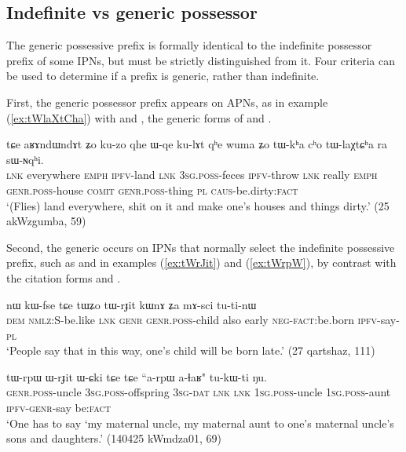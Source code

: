 \subsection{Indefinite vs generic possessor} \label{sec:indef.genr.poss}
The generic possessive prefix  is formally identical to the indefinite possessor prefix of some IPNs, but must be strictly distinguished from it. Four criteria can be used to determine if a  prefix is generic, rather than indefinite.

First, the generic possessor prefix appears on APNs, as in example (\ref{ex:tWlaXtCha}) with  and , the generic forms of  and .

\begin{exe}
\ex \label{ex:tWlaXtCha}
\gll tɕe  	aʁɤndɯndɤt  	ʑo  	ku-zo  	qhe  	ɯ-qe  	ku-lɤt  	qʰe	wuma  ʑo  	tɯ-kʰa  	cʰo  	tɯ-laχtɕʰa  	ra  	sɯ-ɴqʰi.  \\
\textsc{lnk} everywhere \textsc{emph} \textsc{ipfv}-land \textsc{lnk} \textsc{3sg.poss}-feces \textsc{ipfv}-throw \textsc{lnk} really \textsc{emph} \textsc{genr.poss}-house \textsc{comit} \textsc{genr.poss}-thing \textsc{pl} \textsc{caus}-be.dirty:\textsc{fact} \\
\glt `(Flies) land everywhere, shit on it and make one's houses and things dirty.' (25 akWzgumba, 59)
\end{exe}

Second, the generic  occurs on IPNs that normally select the  indefinite possessive prefix, such as  and  in examples (\ref{ex:tWrJit}) and (\ref{ex:tWrpW}), by contrast with the citation forms   and .

\begin{exe}
\ex \label{ex:tWrJit}
\gll nɯ 	kɯ-fse 	tɕe 	tɯʑo 	tɯ-rɟit 	kɯnɤ 	ʑa 	mɤ-sci 	tu-ti-nɯ \\
\textsc{dem} \textsc{nmlz}:S-be.like \textsc{lnk} \textsc{genr} \textsc{genr.poss}-child also early \textsc{neg-fact}:be.born \textsc{ipfv}-say-\textsc{pl} \\
\glt `People say that in this way, one's child will be born late.' (27 qartshaz, 111)
\end{exe}

\begin{exe}
\ex \label{ex:tWrpW}
\gll  tɯ-rpɯ 	ɯ-rɟit 	ɯ-ɕki 	tɕe 	tɕe 	``a-rpɯ a-ɬaʁ" 	tu-kɯ-ti 	ŋu. \\
\textsc{genr.poss}-uncle \textsc{3sg.poss}-offspring \textsc{3sg-dat} \textsc{lnk} \textsc{lnk} \textsc{1sg.poss}-uncle \textsc{1sg.poss}-aunt \textsc{ipfv-genr}-say  be:\textsc{fact} \\
\glt `One has to say `my maternal uncle, my maternal aunt to one's maternal uncle's sons and daughters.' (140425 kWmdza01, 69)
\end{exe}


